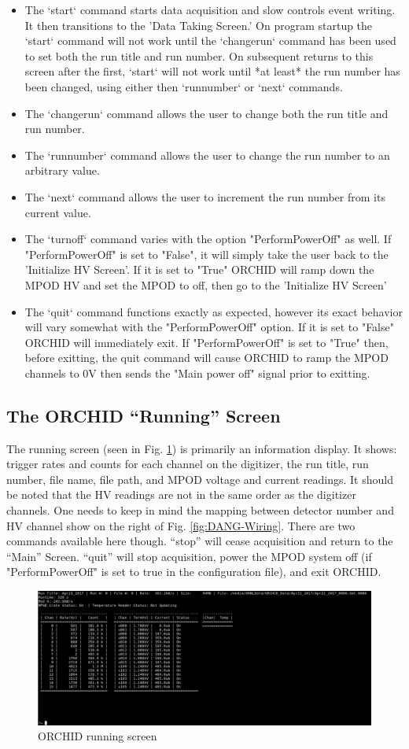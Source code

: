 \documentclass[onecolumn, 10pt, letterpaper, twoside]{article}
\begin{document}
\begin{itemize}
\item The `start` command starts data acquisition and slow controls event writing. It then transitions to the 'Data Taking Screen.' On program startup the `start` command will not work until the `changerun` command has been used to set both the run title and run number. On subsequent returns to this screen after the first, `start` will not work until *at least* the run number has been changed, using either then `runnumber` or `next` commands.
\item The `changerun` command allows the user to change both the run title and run number.
\item The `runnumber` command allows the user to change the run number to an arbitrary value.
\item The `next` command allows the user to increment the run number from its current value.
\item The `turnoff` command varies with the option "PerformPowerOff" as well. If "PerformPowerOff" is set to "False", it will simply take the user back to the 'Initialize HV Screen'. If it is set to "True" ORCHID will ramp down the MPOD HV and set the MPOD to off, then go to the 'Initialize HV Screen'
\item The `quit` command functions exactly as expected, however its exact behavior will vary somewhat with the "PerformPowerOff" option. If it is set to "False" ORCHID will immediately exit. If "PerformPowerOff" is set to "True" then, before exitting, the quit command will cause ORCHID to ramp the MPOD channels to 0V then sends the "Main power off" signal prior to exitting.
\end{itemize}

\subsection{The ORCHID ``Running'' Screen}
The running screen (seen in Fig. \ref{fig:ORCHID_Running}) is primarily an information display. It shows: trigger rates and counts for each channel on the digitizer, the run title, run number, file name, file path, and MPOD voltage and current readings. It should be noted that the HV readings are not in the same order as the digitizer channels. One needs to keep in mind the mapping between detector number and HV channel show on the right of Fig. \ref{fig:DANG-Wiring}. There are two commands available here though. ``stop'' will cease acquisition and return to the ``Main'' Screen. ``quit'' will stop acquisition, power the MPOD system off (if "PerformPowerOff" is set to true in the configuration file), and exit ORCHID.

\begin{figure}[h!]
\begin{center}
\includegraphics[width=\textwidth]{./Running_Screen.png}
\caption{ORCHID running screen}
\label{fig:ORCHID_Running}
\end{center}
\end{figure}
\end{document}
